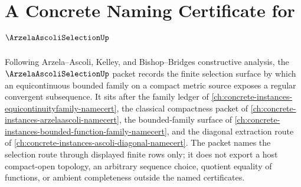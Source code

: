\chapter{A Concrete Naming Certificate for $\ArzelaAscoliSelectionUp$}
\label{ch:concrete-instances-arzela-ascoli-selection-namecert}

Following Arzela--Ascoli, Kelley, and Bishop--Bridges constructive analysis, the $\ArzelaAscoliSelectionUp$ packet records the finite selection surface by which an equicontinuous bounded family on a compact metric source exposes a regular convergent subsequence. It sits after the family ledger of \autoref{ch:concrete-instances-equicontinuityfamily-namecert}, the classical compactness packet of \autoref{ch:concrete-instances-arzelaascoli-namecert}, the bounded-family surface of \autoref{ch:concrete-instances-bounded-function-family-namecert}, and the diagonal extraction route of \autoref{ch:concrete-instances-ascoli-diagonal-namecert}. The packet names the selection route through displayed finite rows only; it does not export a host compact-open topology, an arbitrary sequence choice, quotient equality of functions, or ambient completeness outside the named certificates.

